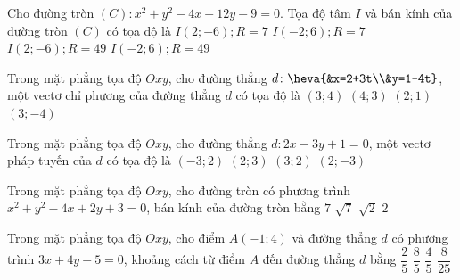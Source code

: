 	\begin{ex}%
		Cho đường tròn $(C)\colon  x^2+y^2-4x+12y-9=0$. Tọa độ tâm $I$ và bán kính của đường tròn $(C)$ có tọa độ là
		\choice
		{\True $I(2 ;  -6) ;   R=7$}
		{$I(-2 ;   6) ;   R=7$}
		{$I(2 ;  -6) ;   R=49$}
		{$I(-2 ;   6) ;   R=49$}
	\end{ex}
	
	\begin{ex}%
		Trong mặt phẳng tọa độ $Oxy$, cho đường thẳng $d\colon \heva{&x=2+3t\\&y=1-4t}$, một vectơ chỉ phương của đường thẳng $d$ có tọa độ là
		\choice
		{$(3;4)$}
		{$(4;3)$}
		{$(2;1)$}
		{\True $(3;-4)$}
	\end{ex}
	\begin{ex}%
		Trong mặt phẳng tọa độ $Oxy$, cho đường thẳng $d\colon 2x-3y+1=0$, một vectơ pháp tuyến của $d$ có tọa độ là
		\choice
		{$(-3;2)$}
		{$(2;3)$}
		{$(3;2)$}
		{\True $(2;-3)$}
	\end{ex}
	\begin{ex}%
		Trong mặt phẳng tọa độ $Oxy$, cho đường tròn có phương trình $x^2+y^2-4x+2y+3=0$, bán kính của đường tròn bằng
		\choice
		{$7$}
		{$\sqrt{7}$}
		{\True $\sqrt{2}$}
		{$2$}
	\end{ex}
	\begin{ex}%
		Trong mặt phẳng tọa độ $Oxy$, cho điểm $A(-1;4)$ và đường thẳng $d$ có phương trình $3x+4y-5=0$, khoảng cách từ điểm $A$ đến đường thẳng $d$ bằng
		\choice
		{$\dfrac{2}{5}$}
		{\True $\dfrac{8}{5}$}
		{$\dfrac{4}{5}$}
		{$\dfrac{8}{25}$}
	\end{ex}
	
